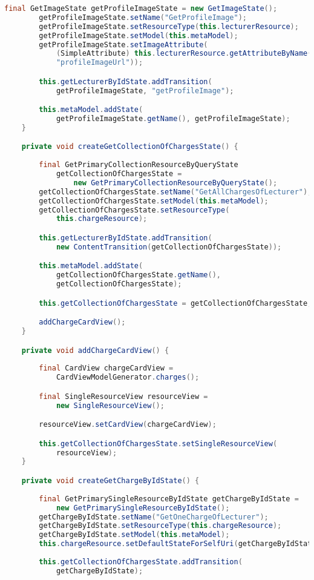 \begin{lstlisting}[label=lst:enfield_model,
language=java,
firstnumber=1,
caption=Beschreibung des \textit{Enfield-Modell} der Referenzimplementierung. ]
		final GetImageState getProfileImageState = new GetImageState();
		getProfileImageState.setName("GetProfileImage");
		getProfileImageState.setResourceType(this.lecturerResource);
		getProfileImageState.setModel(this.metaModel);
		getProfileImageState.setImageAttribute(
			(SimpleAttribute) this.lecturerResource.getAttributeByName(
			"profileImageUrl"));

		this.getLecturerByIdState.addTransition(
			getProfileImageState, "getProfileImage");

		this.metaModel.addState(
			getProfileImageState.getName(), getProfileImageState);
	}

	private void createGetCollectionOfChargesState() {
	
		final GetPrimaryCollectionResourceByQueryState 
			getCollectionOfChargesState = 
				new GetPrimaryCollectionResourceByQueryState();
		getCollectionOfChargesState.setName("GetAllChargesOfLecturer");
		getCollectionOfChargesState.setModel(this.metaModel);
		getCollectionOfChargesState.setResourceType(
			this.chargeResource);

		this.getLecturerByIdState.addTransition(
			new ContentTransition(getCollectionOfChargesState));

		this.metaModel.addState(
			getCollectionOfChargesState.getName(), 
			getCollectionOfChargesState);

		this.getCollectionOfChargesState = getCollectionOfChargesState;

		addChargeCardView();
	}

	private void addChargeCardView() {
	
		final CardView chargeCardView = 
			CardViewModelGenerator.charges();

		final SingleResourceView resourceView = 
			new SingleResourceView();

		resourceView.setCardView(chargeCardView);

		this.getCollectionOfChargesState.setSingleResourceView(
			resourceView);
	}

	private void createGetChargeByIdState() {
	
		final GetPrimarySingleResourceByIdState getChargeByIdState = 
			new GetPrimarySingleResourceByIdState();
		getChargeByIdState.setName("GetOneChargeOfLecturer");
		getChargeByIdState.setResourceType(this.chargeResource);
		getChargeByIdState.setModel(this.metaModel);
		this.chargeResource.setDefaultStateForSelfUri(getChargeByIdState);
		
		this.getCollectionOfChargesState.addTransition(
			getChargeByIdState);


\end{lstlisting}
